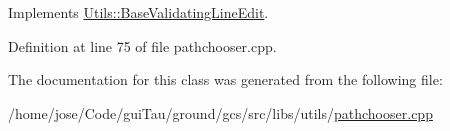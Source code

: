 Implements \hyperlink{class_utils_1_1_base_validating_line_edit_acaf01e0ff24a7e62f45d7a4eddb04941}{Utils\-::\-Base\-Validating\-Line\-Edit}.



Definition at line 75 of file pathchooser.\-cpp.



The documentation for this class was generated from the following file\-:\begin{DoxyCompactItemize}
\item 
/home/jose/\-Code/gui\-Tau/ground/gcs/src/libs/utils/\hyperlink{pathchooser_8cpp}{pathchooser.\-cpp}\end{DoxyCompactItemize}
